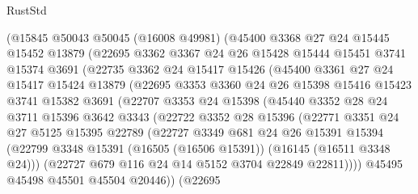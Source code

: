 \begin{lexlean}{RustStd}
\begin{coremodule}
          (@15845
            @50043
            @50045
            (@16008 @49981)
            (@45400
              @3368
              @27
              @24
              @15445
              @15452
              @13879
              (@22695
                @3362
                @3367
                @24
                @26
                @15428
                @15444
                @15451
                @3741
                @15374
                @3691
                (@22735
                  @3362
                  @24
                  @15417
                  @15426
                  (@45400
                    @3361
                    @27
                    @24
                    @15417
                    @15424
                    @13879
                    (@22695
                      @3353
                      @3360
                      @24
                      @26
                      @15398
                      @15416
                      @15423
                      @3741
                      @15382
                      @3691
                      (@22707
                        @3353
                        @24
                        @15398
                        (@45440
                          @3352
                          @28
                          @24
                          @3711
                          @15396
                          @3642
                          @3343
                          (@22722
                            @3352
                            @28
                            @15396
                            (@22771
                              @3351
                              @24
                              @27
                              @5125
                              @15395
                              @22789
                              (@22727
                                @3349
                                @681
                                @24
                                @26
                                @15391
                                @15394
                                (@22799
                                  @3348
                                  @15391
                                  (@16505 (@16506 @15391))
                                  (@16145 (@16511 @3348 @24)))
                                (@22727 @679 @116 @24 @14 @5152 @3704 @22849 @22811))))
                          @45495
                          @45498
                          @45501
                          @45504
                          @20446))
                      (@22695

\end{coremodule}
\end{lexlean}
